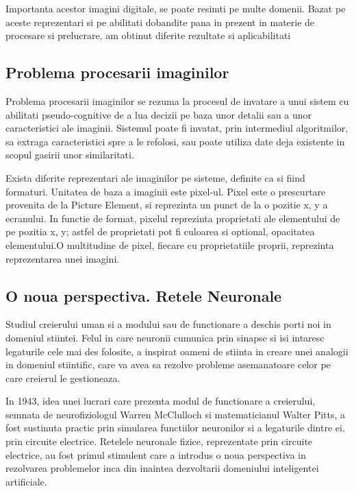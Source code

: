 	Importanta acestor imagini digitale, se poate resimti pe multe domenii. Bazat pe aceste reprezentari si pe abilitati dobandite pana in prezent in materie de procesare si prelucrare, am obtinut diferite rezultate si aplicabilitati
	
	\subsection{Problema procesarii imaginilor}
	Problema procesarii imaginilor se rezuma la procesul de invatare a unui sistem cu abilitati pseudo-cognitive de a lua decizii pe baza unor detalii sau a unor caracteristici ale imaginii. Sistemul poate fi invatat, prin intermediul algoritmilor, sa extraga caracteristici spre a le refolosi, sau poate utiliza date deja existente in scopul gasirii unor similaritati. 
	
	Exista diferite reprezentari ale imaginilor pe sisteme, definite ca si fiind formaturi. Unitatea de baza a imaginii este pixel-ul. Pixel este o prescurtare provenita de la Picture Element, si reprezinta un punct de la o pozitie x, y a ecranului. In functie de format, pixelul reprezinta proprietati ale elementului de pe pozitia x, y; astfel de proprietati pot fi culoarea si optional, opacitatea elementului.O multitudine de pixel, fiecare cu proprietatiile proprii, reprezinta reprezentarea unei imagini. \cite{image_representation}
	
	\subsection{O noua perspectiva. Retele Neuronale}
	Studiul creierului uman si a modului sau de functionare a deschis porti noi in domeniul stiintei. Felul in care neuronii cumunica prin sinapse si isi intaresc legaturile cele mai des folosite, a inspirat oameni de stiinta in creare unei analogii in domeniul stiintific, care va avea sa rezolve probleme asemanatoare celor pe care creierul le gestioneaza.
	
	In 1943, idea unei  lucrari care prezenta modul de functionare a creierului, semnata de  neurofiziologul Warren McClulloch si matematicianul Walter Pitts,   a fost sustinuta practic prin simularea functiilor neuronilor si a legaturile dintre ei, prin circuite electrice. Retelele neuronale fizice, reprezentate prin circuite electrice, au fost primul stimulent care a introdus o noua perspectiva in rezolvarea problemelor inca din inaintea dezvoltarii domeniului inteligentei artificiale. 
	
